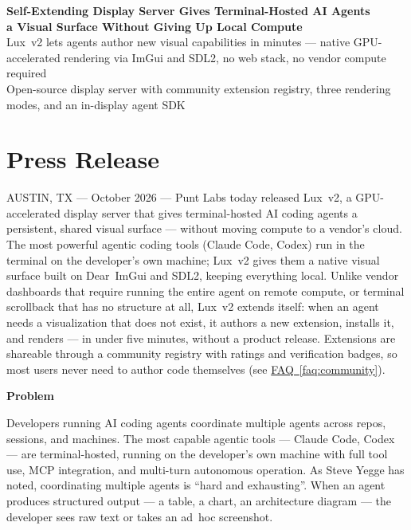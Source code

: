 \documentclass[11pt,letterpaper]{article}
\newcommand{\prsection}[1]{%
  \vspace{1em}%
  {\large\bfseries\color{SectionBlue}#1}%
  \vspace{0.3em}\par%
}
\newcommand{\faqref}[1]{\hyperref[#1]{FAQ~\ref*{#1}}}
\begin{document}
\begin{center}
  {\LARGE\bfseries\color{SectionBlue}
    Self-Extending Display Server Gives Terminal-Hosted AI Agents\\
    a Visual Surface Without Giving Up Local Compute} \\[0.8em]
  {\large\color{AccentGray}
    Lux~v2 lets agents author new visual capabilities in minutes ---
    native GPU-accelerated rendering via ImGui and SDL2, no web stack,
    no vendor compute required} \\[0.3em]
  {\large\color{AccentGray}
    Open-source display server with community extension registry,
    three rendering modes, and an in-display agent SDK}
\end{center}

\vspace{0.5em}


\section*{Press Release}

AUSTIN, TX --- October 2026 --- Punt Labs today released Lux~v2, a
GPU-accelerated display server that gives terminal-hosted AI coding
agents a persistent, shared visual surface --- without moving compute to a
vendor's cloud.  The most powerful agentic coding tools (Claude
Code\cite{anthropic2025claudecode}, Codex) run in the terminal on the
developer's own machine; Lux~v2 gives them a native visual surface built on
Dear~ImGui\cite{imgui2025} and SDL2, keeping everything local.  Unlike
vendor dashboards that require running the entire agent on remote compute,
or terminal scrollback that has no structure at all, Lux~v2 extends itself:
when an agent needs a visualization that does not exist, it authors a new
extension, installs it, and renders --- in under five minutes, without a
product release.  Extensions are shareable through a community registry with
ratings and verification badges, so most users never need to author code
themselves (see \faqref{faq:community}).

\prsection{Problem}

Developers running AI coding agents coordinate multiple agents across repos,
sessions, and machines.  The most capable agentic tools --- Claude
Code\cite{anthropic2025claudecode}, Codex --- are terminal-hosted, running on
the developer's own machine with full tool use, MCP integration, and
multi-turn autonomous operation.  As Steve Yegge has noted, coordinating
multiple agents is ``hard and exhausting''\cite{yegge2025agents}.  When an
agent produces structured output --- a table, a chart, an architecture
diagram --- the developer sees raw text or takes an ad~hoc screenshot.
\end{document}
